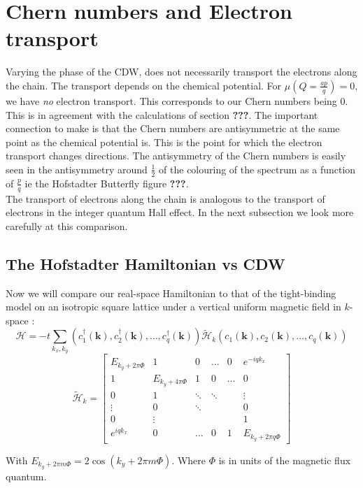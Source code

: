 \documentclass[letterpaper, 10 pt, conference]{ieeeconf}  %
\begin{document}
\section{Chern numbers and Electron transport}

Varying the phase of the CDW, does not necessarily transport the electrons along the chain.
The transport depends on the chemical potential.
For $\mu(Q=\frac{ap}{q}) = 0$, we have \textit{no} electron transport.
This corresponds to our Chern numbers being $0$.
This is in agreement with the calculations of section \textbf{???}.
The important connection to make is that the Chern numbers are antisymmetric at the same point as the chemical potential is.
This is the point for which the electron transport changes directions.
The antisymmetry of the Chern numbers is easily seen in the antisymmetry around $\frac{1}{2}$ of the colouring of the spectrum as a function of $\frac{p}{q}$ ie the Hofstadter Butterfly figure \textbf{???}.\\
The transport of electrons along the chain is analogous to the transport of electrons in the integer quantum Hall effect.
In the next subsection we look more carefully at this comparison.

\subsection{The Hofstadter Hamiltonian vs CDW}
Now we will compare our real-space Hamiltonian to that of the tight-binding model on an
isotropic square lattice under a vertical uniform magnetic field in $k$-space \cite{Yoshioka}:
$$
\mathcal{H}=-t\sum_{k_{x},k_{y}}(c_{1}^{\dagger}(\textbf{k}),c_{2}^{\dagger}(\textbf{k}),\dots,c_{q}^{\dagger}(\textbf{k}))\tilde{\mathcal{H}}_{k}(c_{1}(\textbf{k}),c_{2}(\textbf{k}),\dots,c_{q}(\textbf{k}))
$$
$$
\tilde{\mathcal{H}}_{k}=\begin{bmatrix}
E_{k_{y}+2\pi \Phi}      & 1     & 0      & \hdots     & 0     & e^{-iqk_{x}}  \\
1    &E_{k_{y}+4\pi \Phi} & 1 & 0 & \hdots     & 0 \\
0               & 1 & \ddots & \ddots  &  &\vdots \\
\vdots   & 0 & \ddots &  &  &  0  \\
0 &  \vdots    &  &  &  & 1 \\
e^{iqk_{x}} & 0 &    \hdots          &0   & 1      & E_{k_{y}+2\pi q\Phi}
\end{bmatrix}
$$

With $E_{k_{y}+2\pi m\Phi}=2\cos(k_{y}+2\pi m\Phi)$. Where $\Phi$ is in units of the magnetic flux quantum.
\end{document}
